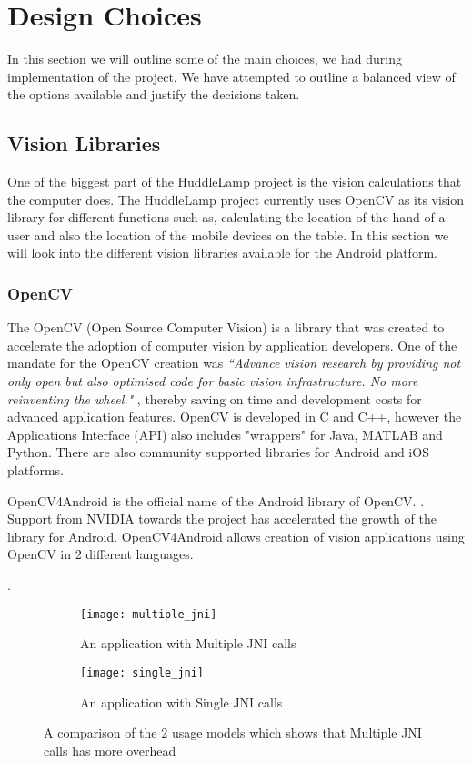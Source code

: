 
 
\section{Design Choices} \label{design_choice_android_camera}
In this section we will outline some of the main choices, we had during implementation of the project. We have attempted to outline a balanced view of the options available and justify the decisions taken.
 
\subsection{Vision Libraries}
One of the biggest part of the HuddleLamp project is the vision calculations that the computer does. The HuddleLamp project currently uses OpenCV as its vision library for different functions such as, calculating the location of the hand of a user and also the location of the mobile devices on the table. In this section we will look into the different vision libraries available for the Android platform.
 
\subsubsection{OpenCV} \label{opencv_section}
The OpenCV (Open Source Computer Vision) is a library that was created to accelerate the adoption of computer vision by application developers. One of the mandate for the OpenCV creation was \emph{``Advance vision research by providing not only open but also optimised code for basic vision infrastructure. No more reinventing the wheel."}
\cite{opencv_wiki}, thereby saving on time and development costs for advanced application features. 
OpenCV is developed in C and C++, however the Applications Interface (API) also includes "wrappers" for Java, MATLAB and Python. There are also community supported libraries for Android and iOS platforms.

OpenCV4Android is the official name of the Android library of OpenCV. 
\cite{opencv4android_link}. 
Support from NVIDIA towards the project has accelerated the growth of the library for Android. OpenCV4Android allows creation of vision applications using OpenCV in 2  different languages.

\cite{opencv_usage_model}. 

\begin{figure}[H]
    \centering
    \begin{subfigure}[b]{0.47\textwidth}
        \centering
        \texttt{[image: multiple\_jni]}
        \caption{An application with Multiple JNI calls}
    \end{subfigure}
    \hfill
    \begin{subfigure}[b]{0.47\textwidth}
        \centering
        \texttt{[image: single\_jni]}
        \caption{An application with Single JNI calls}
    \end{subfigure}
    \hfill
    \caption{A comparison of the 2 usage models which shows that Multiple JNI calls has more overhead\cite{opencv_jni_images}}
     \label{two_usage_models}
\end{figure}

